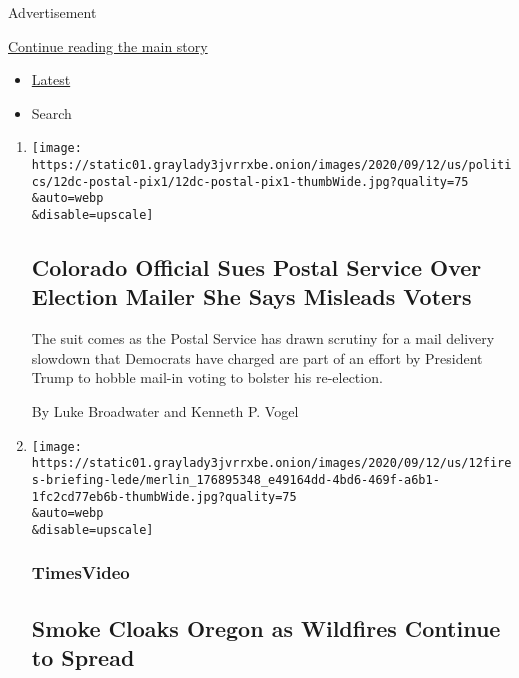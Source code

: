 Advertisement

\protect\hyperlink{after-mid1}{Continue reading the main story}

\begin{itemize}
\tightlist
\item
  \protect\hyperlink{stream-panel}{Latest}
\item
  Search
\end{itemize}

\begin{enumerate}
\def\labelenumi{\arabic{enumi}.}
\item
  \href{/2020/09/12/us/politics/colorado-postal-service-lawsuit-election-mailer.html}{}

  \texttt{[image: https://static01.graylady3jvrrxbe.onion/images/2020/09/12/us/politics/12dc-postal-pix1/12dc-postal-pix1-thumbWide.jpg?quality=75\\\&auto=webp\\\&disable=upscale]}

  \hypertarget{colorado-official-sues-postal-service-over-election-mailer-she-says-misleads-voters}{%
  \subsection{Colorado Official Sues Postal Service Over Election Mailer
  She Says Misleads
  Voters}\label{colorado-official-sues-postal-service-over-election-mailer-she-says-misleads-voters}}

  The suit comes as the Postal Service has drawn scrutiny for a mail
  delivery slowdown that Democrats have charged are part of an effort by
  President Trump to hobble mail-in voting to bolster his re-election.

  By Luke Broadwater and Kenneth P. Vogel
\item
  \href{/video/us/100000007337615/wildfires-oregon.html}{}

  \texttt{[image: https://static01.graylady3jvrrxbe.onion/images/2020/09/12/us/12fires-briefing-lede/merlin\_176895348\_e49164dd-4bd6-469f-a6b1-1fc2cd77eb6b-thumbWide.jpg?quality=75\\\&auto=webp\\\&disable=upscale]}

  \hypertarget{timesvideo}{%
  \subsubsection{TimesVideo}\label{timesvideo}}

  \hypertarget{smoke-cloaks-oregon-as-wildfires-continue-to-spread}{%
  \subsection{Smoke Cloaks Oregon as Wildfires Continue to
  Spread}\label{smoke-cloaks-oregon-as-wildfires-continue-to-spread}}


\end{enumerate}
